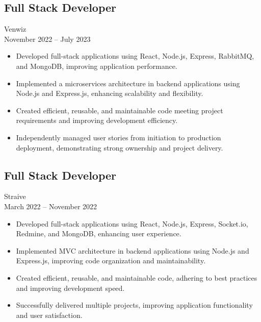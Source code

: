 \documentclass[10pt, letterpaper]{article}
\begin{document}
        \subsection{Full Stack Developer}
            Venwiz \\
            November 2022 – July 2023
            \begin{itemize}[leftmargin=*]
                \item Developed full-stack applications using React, Node.js, Express, RabbitMQ, and MongoDB, improving application performance.
                \item Implemented a microservices architecture in backend applications using Node.js and Express.js, enhancing scalability and flexibility.
                \item Created efficient, reusable, and maintainable code meeting project requirements and improving development efficiency.
                \item Independently managed user stories from initiation to production deployment, demonstrating strong ownership and project delivery.
            \end{itemize}
        \subsection{Full Stack Developer}
            Straive \\
            March 2022 – November 2022
            \begin{itemize}[leftmargin=*]
                \item Developed full-stack applications using React, Node.js, Express, Socket.io, Redmine, and MongoDB, enhancing user experience.
                \item Implemented MVC architecture in backend applications using Node.js and Express.js, improving code organization and maintainability.
                \item Created efficient, reusable, and maintainable code, adhering to best practices and improving development speed.
                \item Successfully delivered multiple projects, improving application functionality and user satisfaction.
            \end{itemize}
\end{document}
